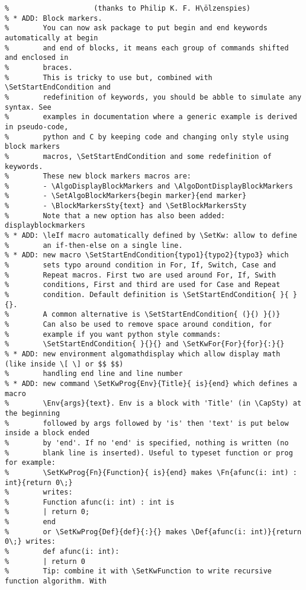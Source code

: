 \documentclass[a4paper]{article}
\begin{document}
\begin{verbatim}
%                    (thanks to Philip K. F. H\ölzenspies)
% * ADD: Block markers. 
%        You can now ask package to put begin and end keywords automatically at begin
%        and end of blocks, it means each group of commands shifted and enclosed in
%        braces.
%        This is tricky to use but, combined with \SetStartEndCondition and
%        redefinition of keywords, you should be abble to simulate any syntax. See
%        examples in documentation where a generic example is derived in pseudo-code,
%        python and C by keeping code and changing only style using block markers
%        macros, \SetStartEndCondition and some redefinition of keywords.
%        These new block markers macros are:
%        - \AlgoDisplayBlockMarkers and \AlgoDontDisplayBlockMarkers
%        - \SetAlgoBlockMarkers{begin marker}{end marker}
%        - \BlockMarkersSty{text} and \SetBlockMarkersSty
%        Note that a new option has also been added: displayblockmarkers
% * ADD: \leIf macro automatically defined by \SetKw: allow to define
%        an if-then-else on a single line.
% * ADD: new macro \SetStartEndCondition{typo1}{typo2}{typo3} which
%        sets typo around condition in For, If, Switch, Case and
%        Repeat macros. First two are used around For, If, Swith
%        conditions, First and third are used for Case and Repeat
%        condition. Default definition is \SetStartEndCondition{ }{ }{}.
%        A common alternative is \SetStartEndCondition{ (}{) }{)}
%        Can also be used to remove space around condition, for
%        example if you want python style commands:
%        \SetStartEndCondition{ }{}{} and \SetKwFor{For}{for}{:}{}
% * ADD: new environment algomathdisplay which allow display math (like inside \[ \] or $$ $$) 
%        handling end line and line number
% * ADD: new command \SetKwProg{Env}{Title}{ is}{end} which defines a macro
%        \Env{args}{text}. Env is a block with 'Title' (in \CapSty) at the beginning
%        followed by args followed by 'is' then 'text' is put below inside a block ended
%        by 'end'. If no 'end' is specified, nothing is written (no
%        blank line is inserted). Useful to typeset function or prog for example:
%        \SetKwProg{Fn}{Function}{ is}{end} makes \Fn{afunc(i: int) : int}{return 0\;}                    
%        writes: 
%        Function afunc(i: int) : int is
%        | return 0;
%        end
%        or \SetKwProg{Def}{def}{:}{} makes \Def{afunc(i: int)}{return 0\;} writes:
%        def afunc(i: int):
%        | return 0
%        Tip: combine it with \SetKwFunction to write recursive function algorithm. With

\end{verbatim}
\end{document}
